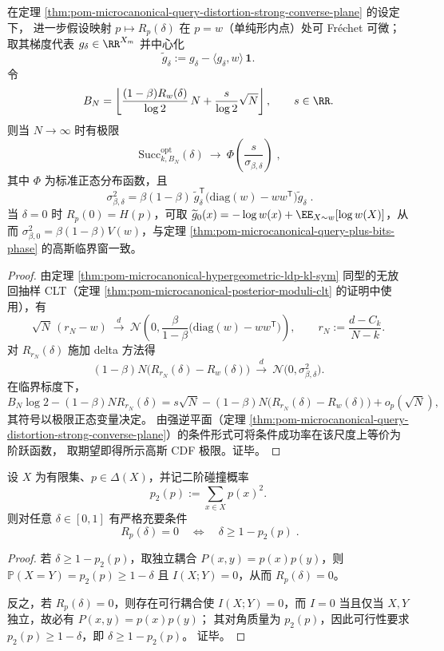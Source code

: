 \begin{theorem}\label{thm:pom-microcanonical-query-distortion-critical-window-clt}
在定理 \ref{thm:pom-microcanonical-query-distortion-strong-converse-plane} 的设定下，
进一步假设映射 \(p\mapsto R_p(\delta)\) 在 \(p=w\)（单纯形内点）处可 Fr\'echet 可微；
取其梯度代表 \(g_\delta\in\RR^{X_m}\) 并中心化
\[
\widetilde g_\delta:=g_\delta-\langle g_\delta,w\rangle\,\mathbf 1.
\]
令
\[
B_N=\left\lfloor \frac{(1-\beta)R_w(\delta)}{\log 2}\,N+\frac{s}{\log 2}\sqrt N\right\rfloor,\qquad s\in\RR.
\]
则当 \(N\to\infty\) 时有极限
\[
\boxed{\;
\mathrm{Succ}^{\mathrm{opt}}_{k,B_N}(\delta)\ \longrightarrow\ \Phi\!\left(\frac{s}{\sigma_{\beta,\delta}}\right)\; } ,
\]
其中 \(\Phi\) 为标准正态分布函数，且
\[
\boxed{\;
\sigma_{\beta,\delta}^2
=\beta(1-\beta)\ \widetilde g_\delta^{\mathsf T}\bigl(\mathrm{diag}(w)-ww^{\mathsf T}\bigr)\widetilde g_\delta\; } .
\]
当 \(\delta=0\) 时 \(R_p(0)=H(p)\)，可取 \(\widetilde g_0(x)=-\log w(x)+\EE_{X\sim w}[\log w(X)]\)，从而 \(\sigma_{\beta,0}^2=\beta(1-\beta)V(w)\)，与定理 \ref{thm:pom-microcanonical-query-plus-bits-phase} 的高斯临界窗一致。
\end{theorem}
\begin{proof}
由定理 \ref{thm:pom-microcanonical-hypergeometric-ldp-kl-sym} 同型的无放回抽样 CLT（定理 \ref{thm:pom-microcanonical-posterior-moduli-clt} 的证明中使用），有
\[
\sqrt N\,(r_N-w)\ \xrightarrow{d}\ \mathcal N\!\left(0,\frac{\beta}{1-\beta}\bigl(\mathrm{diag}(w)-ww^{\mathsf T}\bigr)\right),
\qquad r_N:=\frac{d-C_k}{N-k}.
\]
对 \(R_{r_N}(\delta)\) 施加 delta 方法得
\[
(1-\beta)N\bigl(R_{r_N}(\delta)-R_w(\delta)\bigr)
\ \xrightarrow{d}\ \mathcal N\bigl(0,\sigma_{\beta,\delta}^2\bigr).
\]
在临界标度下，
\[
B_N\log 2-(1-\beta)N R_{r_N}(\delta)=s\sqrt N-(1-\beta)N\bigl(R_{r_N}(\delta)-R_w(\delta)\bigr)+o_p(\sqrt N),
\]
其符号以极限正态变量决定。
由强逆平面（定理 \ref{thm:pom-microcanonical-query-distortion-strong-converse-plane}）的条件形式可将条件成功率在该尺度上等价为阶跃函数，
取期望即得所示高斯 CDF 极限。证毕。
\end{proof}

\begin{proposition}\label{prop:pom-diagonal-rate-zero-threshold-collision}
设 \(X\) 为有限集、\(p\in\Delta(X)\)，并记二阶碰撞概率
\[
p_2(p):=\sum_{x\in X}p(x)^2.
\]
则对任意 \(\delta\in[0,1]\) 有严格充要条件
\[
\boxed{\;
R_p(\delta)=0\quad\Longleftrightarrow\quad \delta\ge 1-p_2(p)\; } .
\]
\end{proposition}
\begin{proof}
若 \(\delta\ge 1-p_2(p)\)，取独立耦合 \(P(x,y)=p(x)p(y)\)，则 \(\mathbb{P}(X=Y)=p_2(p)\ge 1-\delta\) 且 \(I(X;Y)=0\)，从而 \(R_p(\delta)=0\)。
\par
反之，若 \(R_p(\delta)=0\)，则存在可行耦合使 \(I(X;Y)=0\)，而 \(I=0\) 当且仅当 \(X,Y\) 独立，故必有 \(P(x,y)=p(x)p(y)\)；
其对角质量为 \(p_2(p)\)，因此可行性要求 \(p_2(p)\ge 1-\delta\)，即 \(\delta\ge 1-p_2(p)\)。
证毕。
\end{proof}

